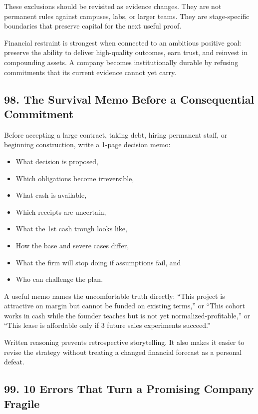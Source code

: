 These exclusions should be revisited as evidence changes. They are not permanent rules against campuses, labs, or larger teams. They are stage-specific boundaries that preserve capital for the next useful proof.

Financial restraint is strongest when connected to an ambitious positive goal: preserve the ability to deliver high-quality outcomes, earn trust, and reinvest in compounding assets. A company becomes institutionally durable by refusing commitments that its current evidence cannot yet carry.

\subsection*{98. The Survival Memo Before a Consequential Commitment}

Before accepting a large contract, taking debt, hiring permanent staff, or beginning construction, write a 1-page decision memo:
\begin{itemize}
\item What decision is proposed,
\item Which obligations become irreversible,
\item What cash is available,
\item Which receipts are uncertain,
\item What the 1st cash trough looks like,
\item How the base and severe cases differ,
\item What the firm will stop doing if assumptions fail, and
\item Who can challenge the plan.
\end{itemize}

A useful memo names the uncomfortable truth directly: ``This project is attractive on margin but cannot be funded on existing terms,'' or ``This cohort works in cash while the founder teaches but is not yet normalized-profitable,'' or ``This lease is affordable only if 3 future sales experiments succeed.''

Written reasoning prevents retrospective storytelling. It also makes it easier to revise the strategy without treating a changed financial forecast as a personal defeat.

\subsection*{99. 10 Errors That Turn a Promising Company Fragile}

